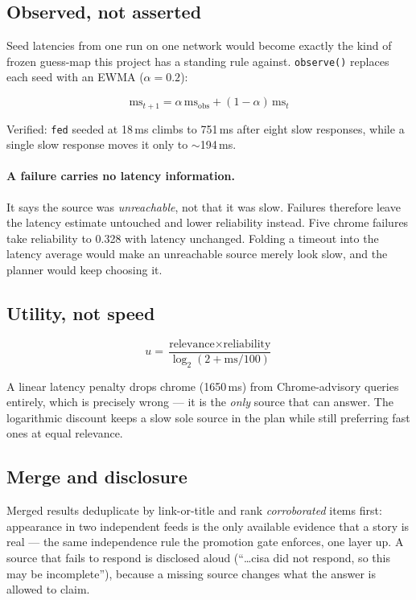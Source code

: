 \documentclass[10pt,twocolumn]{article}
\newcommand{\code}[1]{\texttt{\small #1}}
\begin{document}
\subsection{Observed, not asserted}

Seed latencies from one run on one network would become exactly the kind of frozen
guess-map this project has a standing rule against. \code{observe()} replaces each seed
with an EWMA ($\alpha = 0.2$):

\[
\text{ms}_{t+1} = \alpha\,\text{ms}_{\text{obs}} + (1-\alpha)\,\text{ms}_t
\]

Verified: \code{fed} seeded at 18\,ms climbs to 751\,ms after eight slow responses, while
a single slow response moves it only to $\sim$194\,ms.

\paragraph{A failure carries no latency information.} It says the source was
\emph{unreachable}, not that it was slow. Failures therefore leave the latency estimate
untouched and lower reliability instead. Five chrome failures take reliability to 0.328
with latency unchanged. Folding a timeout into the latency average would make an
unreachable source merely look slow, and the planner would keep choosing it.

\subsection{Utility, not speed}

\[
u = \frac{\text{relevance} \times \text{reliability}}{\log_2\!\left(2 + \text{ms}/100\right)}
\]

A linear latency penalty drops chrome (1650\,ms) from Chrome-advisory queries entirely,
which is precisely wrong --- it is the \emph{only} source that can answer. The logarithmic
discount keeps a slow sole source in the plan while still preferring fast ones at equal
relevance.

\subsection{Merge and disclosure}

Merged results deduplicate by link-or-title and rank \emph{corroborated} items first:
appearance in two independent feeds is the only available evidence that a story is real
--- the same independence rule the promotion gate enforces, one layer up. A source that
fails to respond is disclosed aloud (``\ldots cisa did not respond, so this may be
incomplete''), because a missing source changes what the answer is allowed to claim.
\end{document}
